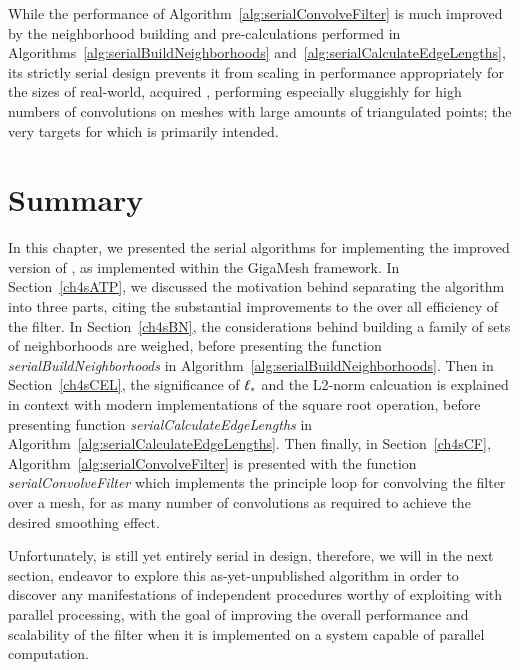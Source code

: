 %
%

While the performance of Algorithm~\ref{alg:serialConvolveFilter} is much improved by the neighborhood building and pre-calculations performed in Algorithms~\ref{alg:serialBuildNeighborhoods} and~\ref{alg:serialCalculateEdgeLengths}, its strictly serial design prevents it from scaling in performance appropriately for the sizes of real-world, acquired \tdd{}, performing especially sluggishly for high numbers of convolutions on meshes with large amounts of triangulated points; the very targets for which  is primarily intended.

%
%
%
%
\section{Summary}
\label{ch4sDN}
In this chapter, we presented the serial algorithms for implementing the improved version of , as implemented within the GigaMesh framework. In Section~\ref{ch4sATP}, we discussed the motivation behind separating the algorithm into three parts, citing the substantial improvements to the over all efficiency of the filter. In Section~\ref{ch4sBN}, the considerations behind building a family of sets of neighborhoods are weighed, before presenting the function \textit{serialBuildNeighborhoods} in Algorithm~\ref{alg:serialBuildNeighborhoods}. Then in Section~\ref{ch4sCEL}, the significance of $\ell_\ast$ and the L2-norm calcuation is explained in context with modern implementations of the square root operation, before presenting function \textit{serialCalculateEdgeLengths} in Algorithm~\ref{alg:serialCalculateEdgeLengths}.   Then finally, in Section~\ref{ch4sCF}, Algorithm~\ref{alg:serialConvolveFilter} is presented with the function \textit{serialConvolveFilter} which implements the principle loop for convolving the filter over a mesh, for as many number of convolutions as required to achieve the desired smoothing effect.

Unfortunately,  is still yet entirely serial in design, therefore, we will in the next section, endeavor to explore this as-yet-unpublished algorithm in order to discover any manifestations of independent procedures worthy of exploiting with parallel processing, with the goal of improving the overall performance and scalability of the filter when it is implemented on a system capable of parallel computation.

